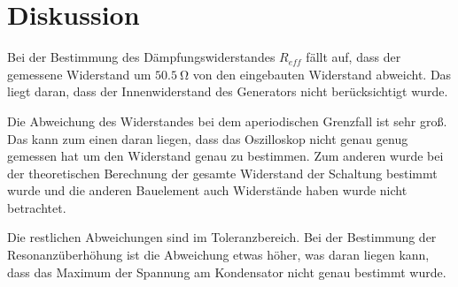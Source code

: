 \section{Diskussion}

Bei der Bestimmung des Dämpfungswiderstandes $R_{eff}$ fällt auf, dass der gemessene
Widerstand um $\SI{50.5}{\ohm}$ von den eingebauten Widerstand abweicht. Das liegt
daran, dass der Innenwiderstand des Generators nicht berücksichtigt wurde.

Die Abweichung des Widerstandes bei dem aperiodischen Grenzfall ist sehr groß.
Das kann zum einen daran liegen, dass das Oszilloskop nicht genau genug gemessen hat um
den Widerstand genau zu bestimmen. Zum anderen wurde bei der theoretischen Berechnung
der gesamte Widerstand der Schaltung bestimmt wurde und die anderen Bauelement auch
Widerstände haben wurde nicht betrachtet.

Die restlichen Abweichungen sind im Toleranzbereich. Bei der Bestimmung der Resonanzüberhöhung
ist die Abweichung etwas höher, was daran liegen kann, dass das Maximum der Spannung am
Kondensator nicht genau bestimmt wurde.
